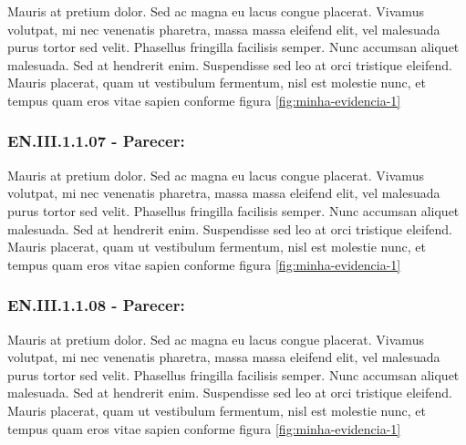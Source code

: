 \documentclass[12pt, a4paper]{article}
\begin{document}
    Mauris at pretium dolor. Sed ac magna eu lacus congue placerat. Vivamus volutpat, mi nec venenatis pharetra, massa massa eleifend elit, vel malesuada purus tortor sed velit. Phasellus fringilla facilisis semper. Nunc accumsan aliquet malesuada. Sed at hendrerit enim. Suspendisse sed leo at orci tristique eleifend. Mauris placerat, quam ut vestibulum fermentum, nisl est molestie nunc, et tempus quam eros vitae sapien  conforme figura \ref{fig:minha-evidencia-1}
    \vspace{1cm} 
    
    \subsubsection*{EN.III.1.1.07 - Parecer:}
    
    Mauris at pretium dolor. Sed ac magna eu lacus congue placerat. Vivamus volutpat, mi nec venenatis pharetra, massa massa eleifend elit, vel malesuada purus tortor sed velit. Phasellus fringilla facilisis semper. Nunc accumsan aliquet malesuada. Sed at hendrerit enim. Suspendisse sed leo at orci tristique eleifend. Mauris placerat, quam ut vestibulum fermentum, nisl est molestie nunc, et tempus quam eros vitae sapien  conforme figura \ref{fig:minha-evidencia-1}
    
    \vspace{1cm} 
    
    \subsubsection*{EN.III.1.1.08 - Parecer:}
    
    Mauris at pretium dolor. Sed ac magna eu lacus congue placerat. Vivamus volutpat, mi nec venenatis pharetra, massa massa eleifend elit, vel malesuada purus tortor sed velit. Phasellus fringilla facilisis semper. Nunc accumsan aliquet malesuada. Sed at hendrerit enim. Suspendisse sed leo at orci tristique eleifend. Mauris placerat, quam ut vestibulum fermentum, nisl est molestie nunc, et tempus quam eros vitae sapien  conforme figura \ref{fig:minha-evidencia-1}
    
    \vspace{1cm} 
    
\end{document}
